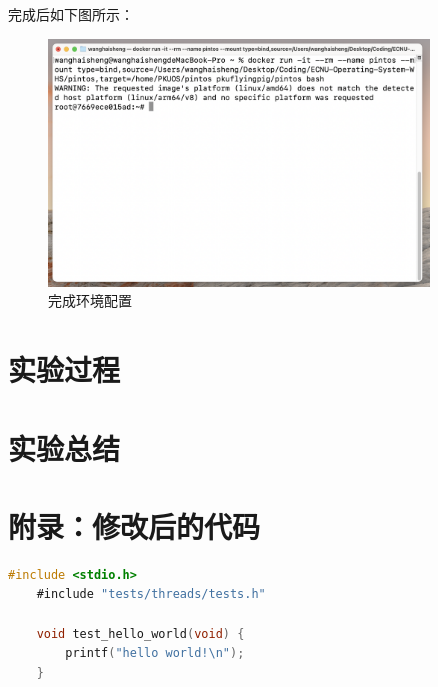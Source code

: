 \documentclass{article}
\begin{document}
完成后如下图所示：

\begin{figure}[H]
	\centering
	\includegraphics[width=0.9\textwidth]{img/run_docker.png}
	\caption{完成环境配置}
\end{figure}

\normalsize

\section{实验过程}

\normalsize

\section{实验总结}

\normalsize

\section{附录：修改后的代码}

\begin{lstlisting}[language=C, title=\texttt{hello-world.c}]
	#include <stdio.h>
	#include "tests/threads/tests.h"
	
	void test_hello_world(void) {
		printf("hello world!\n");
	}
\end{lstlisting}
\end{document}
